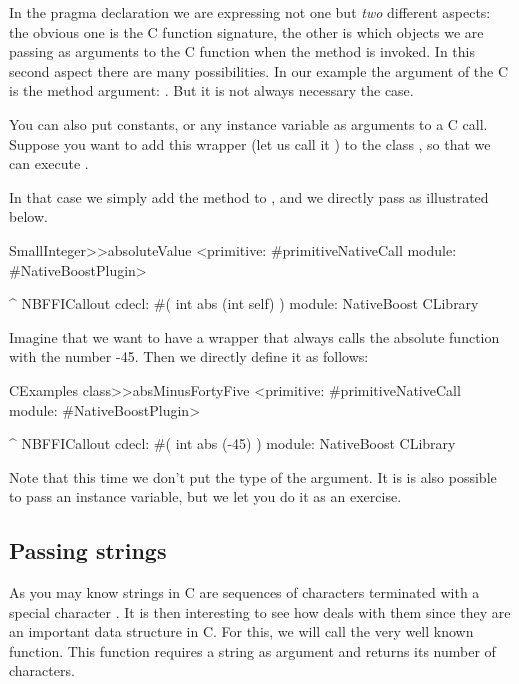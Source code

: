 \documentclass[a4paper,10pt,twoside]{book}
\begin{document}
In the pragma declaration we are expressing not one but \emph{two} different aspects: the obvious one is the C function signature, the other
is which objects we are passing as arguments to the C function when the method is invoked. In this second aspect there are many possibilities. In our example the argument of the C is  the method argument: . But it is not always necessary the case.

You can also put constants,  or any instance variable as arguments to a C call. Suppose you want to add this  wrapper (let us call it ) to the class , so that we can execute .

In that case we simply add the  method to , and we directly pass  as illustrated below.

\begin{code}{}
SmallInteger>>absoluteValue
	<primitive: #primitiveNativeCall module: #NativeBoostPlugin>
	
	^ NBFFICallout cdecl: #( int abs (int self) ) module: NativeBoost CLibrary
\end{code}

Imagine that we want to have a wrapper that always calls the absolute function with the number -45. Then we directly define it as follows:

\begin{code}{}
CExamples class>>absMinusFortyFive
	<primitive: #primitiveNativeCall module: #NativeBoostPlugin>
	
	^ NBFFICallout cdecl: #( int abs (-45) ) module: NativeBoost CLibrary
\end{code}

Note that this time we don't put the type of the argument. It is is also possible to pass an instance variable, but we let you do it as an exercise.

\subsection{Passing strings}
As you may know strings in C are sequences of characters terminated with a special character \ct{\0}. It is then interesting to see how \Spock deals with them since they are an important data structure in C. For this, we will call the very well known  function. This function requires a string as argument and returns its
number of characters. 
\end{document}
